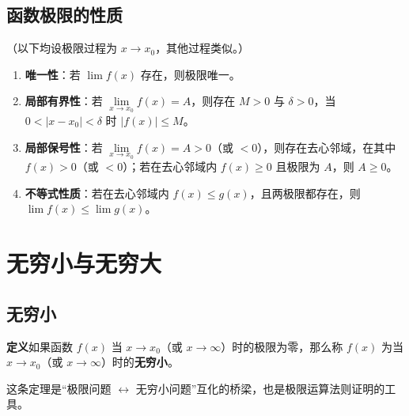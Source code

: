 
\subsection{函数极限的性质}
（以下均设极限过程为 $x\to x_0$，其他过程类似。）
\begin{enumerate}
    \item \textbf{唯一性}：若 $\lim f(x)$ 存在，则极限唯一。
    \item \textbf{局部有界性}：若 $\lim\limits_{x\to x_0}f(x)=A$，则存在 $M>0$ 与 $\delta>0$，当 $0<|x-x_0|<\delta$ 时 $|f(x)|\le M$。
    \item \textbf{局部保号性}：若 $\lim\limits_{x\to x_0}f(x)=A>0$（或 $<0$），则存在去心邻域，在其中 $f(x)>0$（或 $<0$）；若在去心邻域内 $f(x)\ge0$ 且极限为 $A$，则 $A\ge0$。
    \item \textbf{不等式性质}：若在去心邻域内 $f(x)\le g(x)$，且两极限都存在，则 $\lim f(x)\le\lim g(x)$。
\end{enumerate}


\section{无穷小与无穷大}

\subsection{无穷小}
\textbf{定义}\quad 如果函数 $f(x)$ 当 $x\to x_0$（或 $x\to\infty$）时的极限为零，那么称 $f(x)$ 为当 $x\to x_0$（或 $x\to\infty$）时的\textbf{无穷小}。


\noindent 这条定理是“极限问题 $\leftrightarrow$ 无穷小问题”互化的桥梁，也是极限运算法则证明的工具。


